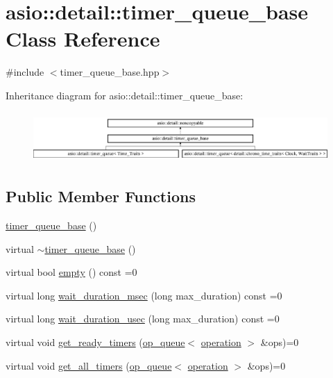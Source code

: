 \hypertarget{classasio_1_1detail_1_1timer__queue__base}{}\section{asio\+:\+:detail\+:\+:timer\+\_\+queue\+\_\+base Class Reference}
\label{classasio_1_1detail_1_1timer__queue__base}


{\ttfamily \#include $<$timer\+\_\+queue\+\_\+base.\+hpp$>$}

Inheritance diagram for asio\+:\+:detail\+:\+:timer\+\_\+queue\+\_\+base\+:\begin{figure}[H]
\begin{center}
\leavevmode
\includegraphics[height=1.926605cm]{classasio_1_1detail_1_1timer__queue__base}
\end{center}
\end{figure}
\subsection*{Public Member Functions}
\begin{DoxyCompactItemize}
\item 
\hyperlink{classasio_1_1detail_1_1timer__queue__base_abda2c964f09d1f40bbd7a47c2de84d84}{timer\+\_\+queue\+\_\+base} ()
\item 
virtual \hyperlink{classasio_1_1detail_1_1timer__queue__base_a502786b2df15d059d7e7cfdb32b1e0fc}{$\sim$timer\+\_\+queue\+\_\+base} ()
\item 
virtual bool \hyperlink{classasio_1_1detail_1_1timer__queue__base_a48dca28c569456158fc7b911bfc73fd9}{empty} () const  =0
\item 
virtual long \hyperlink{classasio_1_1detail_1_1timer__queue__base_addbb860de0d5e7dab3d7c874bced11dc}{wait\+\_\+duration\+\_\+msec} (long max\+\_\+duration) const  =0
\item 
virtual long \hyperlink{classasio_1_1detail_1_1timer__queue__base_a0ede8e7cf51da9a53ffc4b76e4ddeb9f}{wait\+\_\+duration\+\_\+usec} (long max\+\_\+duration) const  =0
\item 
virtual void \hyperlink{classasio_1_1detail_1_1timer__queue__base_aae31209e8eeb64d903fc6254df30ce85}{get\+\_\+ready\+\_\+timers} (\hyperlink{classasio_1_1detail_1_1op__queue}{op\+\_\+queue}$<$ \hyperlink{namespaceasio_1_1detail_a338968609bec20e37145309f8f9ec936}{operation} $>$ \&ops)=0
\item 
virtual void \hyperlink{classasio_1_1detail_1_1timer__queue__base_a7dfa566766b88bc5143d42f79b1883a6}{get\+\_\+all\+\_\+timers} (\hyperlink{classasio_1_1detail_1_1op__queue}{op\+\_\+queue}$<$ \hyperlink{namespaceasio_1_1detail_a338968609bec20e37145309f8f9ec936}{operation} $>$ \&ops)=0
\end{DoxyCompactItemize}
